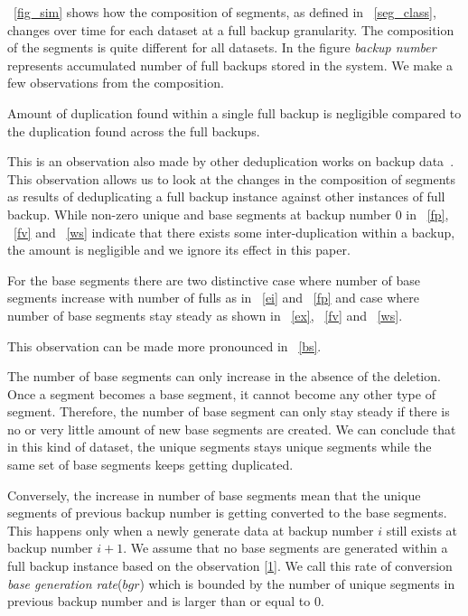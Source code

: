 \figurename~\ref{fig_sim} shows how the composition of segments, as defined in \figurename~\ref{seg_class}, changes over time for each dataset at a full backup granularity.  The composition of the segments is quite different for all datasets. In the figure \emph{backup number} represents accumulated number of full backups stored in the system. We make a few observations from the composition.

\begin{observation}\label{1}
Amount of duplication found within a single full backup is negligible compared to the duplication found across the full backups.
\end{observation}

This is an observation also made by other deduplication works on backup data~\cite{kruus:2010}. This observation allows us to look at the changes in the composition of segments as results of deduplicating a full backup instance against other instances of full backup. While non-zero unique and base segments at backup number 0 in \figurename~\ref{fp},  \figurename~\ref{fv} and  \figurename~\ref{ws} indicate that there exists some inter-duplication within a backup, the amount is negligible and we ignore its effect in this paper.

\begin{observation}\label{2}
For the base segments there are two distinctive case where number of base segments increase with number of fulls as in \figurename~\ref{ei} and \figurename~\ref{fp} and case where number of base segments stay steady as shown in \figurename~\ref{ex}, \figurename~\ref{fv} and \figurename~\ref{ws}.
\end{observation}

This observation can be made more pronounced in \figurename~\ref{bs}.

The number of base segments can only increase in the absence of the deletion. Once a segment becomes a base segment, it cannot become any other type of segment. Therefore, the number of base segment can only stay steady if there is no or very little amount of new base segments are created. We can conclude that in this kind of dataset, the unique segments stays unique segments while the same set of base segments keeps getting duplicated.

Conversely, the increase in number of base segments mean that the unique segments of previous backup number is getting converted to the base segments. This happens only when a newly generate data at backup number $i$ still exists at backup number $i+1$. We assume that no base segments are generated within a full backup instance based on the observation \ref{1}. We call this rate of conversion \emph{base generation rate}($bgr$) which is bounded by the number of unique segments in previous backup number and is larger than or equal to 0.

